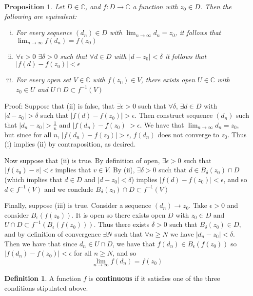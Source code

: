 \documentclass[11pt]{article}
\theoremstyle{plain}
\newtheorem{proposition}[theorem]{Proposition}
\theoremstyle{definition}
\newtheorem{definition}[theorem]{Definition}
\begin{document}
\begin{proposition}
Let $D \in \mathbb{C}$, and $f: D \to \mathbb{C}$ a function with $z_0 \in D$. Then the following are equivalent:
\begin{enumerate}[(i)]
\item  For every sequence $(d_n) \in D$ with $\lim_{n \to \infty}d_n = z_0$, it follows that $\lim_{n\to\infty}f(d_n) = f(z_0)$
\item $\forall\epsilon > 0 $ $\exists \delta > 0$ such that $\forall d \in D$ with $|d - z_0| < \delta$ it follows that $|f(d) - f(z_0)| < \epsilon$
\item For every open set $V \in \mathbb{C}$ with $f(z_0) \in V$, there exists open $U \in \mathbb{C}$ with $z_0 \in U$ and $U \cap D \subset f^{-1}(V)$
\end{enumerate}
\end{proposition}

Proof: Suppose that (ii) is false, that $\exists \epsilon > 0$ such that $\forall \delta$, $\exists d \in D$ with $|d - z_0| > \delta$ such that $|f(d) - f(z_0)| > \epsilon$. Then construct sequence $(d_n)$ such that $|d_n - z_0| > \frac{1}{n}$ and $|f(d_n) - f(z_0)| > \epsilon$. We have that $\lim_{n \to \infty}d_n = z_0$, but since for all $n$, $|f(d_n) - f(z_0)| > \epsilon$, $f(d_n)$ does not converge to $z_0$. Thus (i) implies (ii) by contraposition, as desired.

Now suppose that (ii) is true. By definition of open, $\exists \epsilon > 0$ such that $|f(z_0) - v| < \epsilon$ implies that $v \in V$. By (ii), $\exists \delta > 0$ such that $d \in B_{\delta}(z_0) \cap D$ (which implies that $d \in D$ and $|d - z_0| < \delta$) implies $|f(d) - f(z_0)| < \epsilon$, and so $d \in f^{-1}(V)$ and we conclude $B_{\delta}(z_0) \cap D \subset f^{-1}(V)$

Finally, suppose (iii) is true. Consider a sequence $(d_n) \to z_0$. Take $\epsilon > 0$ and consider $B_{\epsilon}(f(z_0))$. It is open so there exists open $D$ with $z_0 \in D$ and $U \cap D \subset f^{-1}(B_{\epsilon}(f(z_0)))$. Thus there exists $\delta > 0$ such that $B_{\delta}(z_0) \in D$, and by definition of convergence $\exists N$ such that $\forall n \geq N$ we have $|d_n - z_0| < \delta$. Then we have that since $d_n \in U \cap D$, we have that $f(d_n) \in B_{\epsilon}(f(z_0))$ so $|f(d_n) - f(z_0)| < \epsilon$ for all $n \geq N$, and so 
$$ \lim_{n\to\infty} f(d_n) = f(z_0) $$

\begin{definition}
A function $f$ is \textbf{continuous} if it satisfies one of the three conditions stipulated above.
\end{definition}
\end{document}
